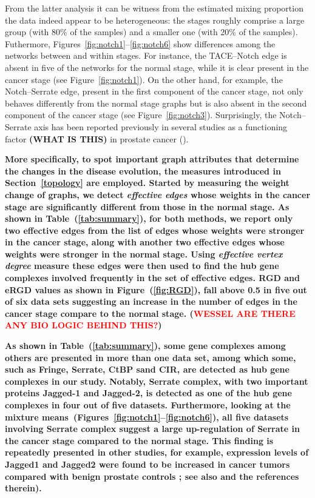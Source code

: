 \documentclass[10pt]{article}
\newcommand{\red}[1]{{\textcolor {red} {#1}}}
\begin{document}
From the latter analysis it can be witness from the estimated mixing proportion the data indeed appear to be heterogeneous: the stages roughly comprise a large group (with 80\% of the samples) and a smaller one (with 20\% of the samples). Futhermore, Figures~\ref{fig:notch1}--\ref{fig:notch6} show differences among the networks between and within stages. For instance, the TACE--Notch edge is absent in five of the networks for the normal stage, while it is clear present in the cancer stage (see Figure~\ref{fig:notch1}). On the other hand, for example, the Notch--Serrate edge, present in the first component of the cancer stage, not only behaves differently from the normal stage graphs but is also absent in the second component of the cancer stage (see Figure~\ref{fig:notch3}). Surprisingly, the Notch--Serrate axis has been reported previously in several studies as a functioning factor \textbf{(WHAT IS THIS)} in prostate cancer (\cite{zhu2013elevated,carvalho2014notch}).



\textbf{
More specifically, to spot important graph attributes that determine the changes in the disease evolution, the measures introduced in Section~\ref{topology} are employed. Started by measuring the weight change of graphs, we detect \textit{effective edges} whose weights in the cancer stage are significantly different from those in the normal stage.  As shown in Table~(\ref{tab:summary}), for both methods,  we report only two  effective edges from the list of edges whose weights were stronger in the cancer stage, along with another  two effective edges whose weights were stronger in the normal stage. Using \textit{effective vertex degree} measure these edges were then used to find the hub gene complexes involved frequently in the set of effective edges. RGD and eRGD values as shown in Figure~(\ref{fig:RGD}), fall above 0.5 in five out of six data sets suggesting an increase in the number of edges in the cancer stage compare to the normal stage. (\red{WESSEL ARE THERE ANY BIO LOGIC BEHIND THIS?})
}

\textbf{
As shown in Table~(\ref{tab:summary}), some gene complexes among others are presented in more than one data set, among which some, such as Fringe, Serrate, CtBP sand CIR, are detected as hub gene complexes in our study. Notably, Serrate complex, with two important proteins Jagged-1 and Jagged-2, is detected as one of the hub gene complexes in four out of five datasets. Furthermore, looking at the mixture means~(Figures~\ref{fig:notch1}--\ref{fig:notch6}), all five datasets involving Serrate complex suggest a large up-regulation of Serrate in the cancer stage compared to the normal stage.  This finding is repeatedly presented in other studies, for example, expression levels of Jagged1 and Jagged2 were found to be increased in cancer tumors compared with benign prostate controls \citep{santagata2004jagged1}; see also \citet{carvalho2014notch} and the references therein).
}
\end{document}
